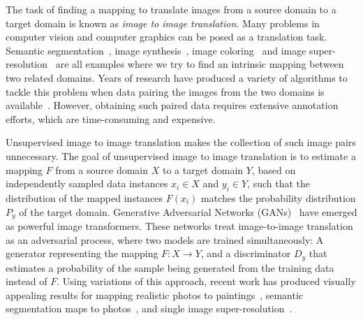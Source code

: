 The task of finding a mapping to translate images from a source domain to a target domain is known as \emph{image to image translation}. Many problems in computer vision and computer graphics can be posed as a translation task. Semantic segmentation~\cite{eigen_predicting_2015}, image synthesis~\cite{xian_texturegan:_2018}, image coloring~\cite{zhang_colorful_2016} and image super-resolution~\cite{ledig_photo-realistic_2017} are all examples where we try to find an intrinsic mapping between two related domains. Years of research have produced a variety of algorithms to tackle this problem when data pairing the images from the two domains is available~\cite{eigen_predicting_2015, isola_image--image_2016, wang_video--video_2018, xian_texturegan:_2018}. However, obtaining such paired data requires extensive annotation efforts, which are time-consuming and expensive.

Unsupervised image to image translation makes the collection of such image pairs unnecessary. The goal of unsupervised image to image translation is to estimate a mapping $F$ from a source domain $X$ to a target domain $Y$, based on independently sampled data instances $x_i \in X$ and $y_i \in Y$, such that the distribution of the mapped instances $F(x_i)$ matches the probability distribution $P_y$ of the target domain. Generative Adversarial Networks (GANs)~\cite{goodfellow_generative_2014} have emerged as powerful image transformers. These networks treat image-to-image translation as an adversarial process, where two models are trained simultaneously: A generator representing the mapping $F: X \to Y$, and a discriminator $D_y$ that estimates a probability of the sample being generated from the training data instead of $F$. Using variations of this approach, recent work has produced visually appealing results for mapping realistic photos to paintings~\cite{zhu_unpaired_2017, yi_dualgan:_2017, tomei_art2real:_2018}, semantic segmentation maps to photos~\cite{karacan_learning_2016, wang_high-resolution_2018}, and single image super-resolution~\cite{ledig_photo-realistic_2017}. 



